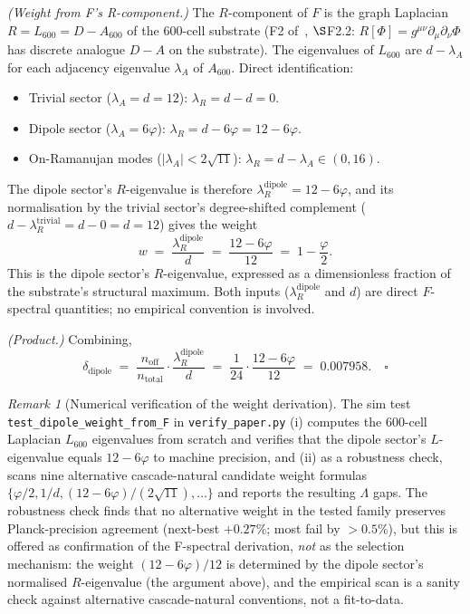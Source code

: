\documentclass[11pt]{article}
\theoremstyle{plain}
\theoremstyle{definition}
\theoremstyle{remark}
\newtheorem{remark}[theorem]{Remark}
\begin{document}
\emph{(Weight from F's R-component.)} The $R$-component of $F$ is the graph Laplacian $R = L_{600} = D - A_{600}$ of the 600-cell substrate (F2 of~\citealp{SmartXXXVI}, $\S$F2.2: $R[\Phi] = g^{\mu\nu}\partial_\mu \partial_\nu \Phi$ has discrete analogue $D - A$ on the substrate). The eigenvalues of $L_{600}$ are $d - \lambda_A$ for each adjacency eigenvalue $\lambda_A$ of $A_{600}$. Direct identification:
\begin{itemize}[leftmargin=2em]
\item Trivial sector ($\lambda_A = d = 12$): $\lambda_R = d - d = 0$.
\item Dipole sector ($\lambda_A = 6\varphi$): $\lambda_R = d - 6\varphi = 12 - 6\varphi$.
\item On-Ramanujan modes ($|\lambda_A| < 2\sqrt{11}$): $\lambda_R = d - \lambda_A \in (0, 16)$.
\end{itemize}
The dipole sector's $R$-eigenvalue is therefore $\lambda_R^\mathrm{dipole} = 12 - 6\varphi$, and its normalisation by the trivial sector's degree-shifted complement ($d - \lambda_R^\mathrm{trivial} = d - 0 = d = 12$) gives the weight
\[
  w \;=\; \frac{\lambda_R^\mathrm{dipole}}{d} \;=\; \frac{12 - 6\varphi}{12} \;=\; 1 - \frac{\varphi}{2}.
\]
This is the dipole sector's $R$-eigenvalue, expressed as a dimensionless fraction of the substrate's structural maximum. Both inputs ($\lambda_R^\mathrm{dipole}$ and $d$) are direct $F$-spectral quantities; no empirical convention is involved.

\emph{(Product.)} Combining,
\[
  \delta_\mathrm{dipole} \;=\; \frac{n_\mathrm{off}}{n_\mathrm{total}} \cdot \frac{\lambda_R^\mathrm{dipole}}{d} \;=\; \frac{1}{24} \cdot \frac{12 - 6\varphi}{12} \;=\; 0.007958. \quad\square
\]

\begin{remark}[Numerical verification of the weight derivation]
The sim test \texttt{test\_dipole\_weight\_from\_F} in \texttt{verify\_paper.py} (i) computes the 600-cell Laplacian $L_{600}$ eigenvalues from scratch and verifies that the dipole sector's $L$-eigenvalue equals $12 - 6\varphi$ to machine precision, and (ii) as a robustness check, scans nine alternative cascade-natural candidate weight formulas $\{\varphi/2, 1/d, (12 - 6\varphi)/(2\sqrt{11}), \ldots\}$ and reports the resulting $\Lambda$ gaps. The robustness check finds that no alternative weight in the tested family preserves Planck-precision agreement (next-best $+0.27\%$; most fail by $> 0.5\%$), but this is offered as confirmation of the F-spectral derivation, \emph{not} as the selection mechanism: the weight $(12-6\varphi)/12$ is determined by the dipole sector's normalised $R$-eigenvalue (the argument above), and the empirical scan is a sanity check against alternative cascade-natural conventions, not a fit-to-data.
\end{remark}
\end{document}
